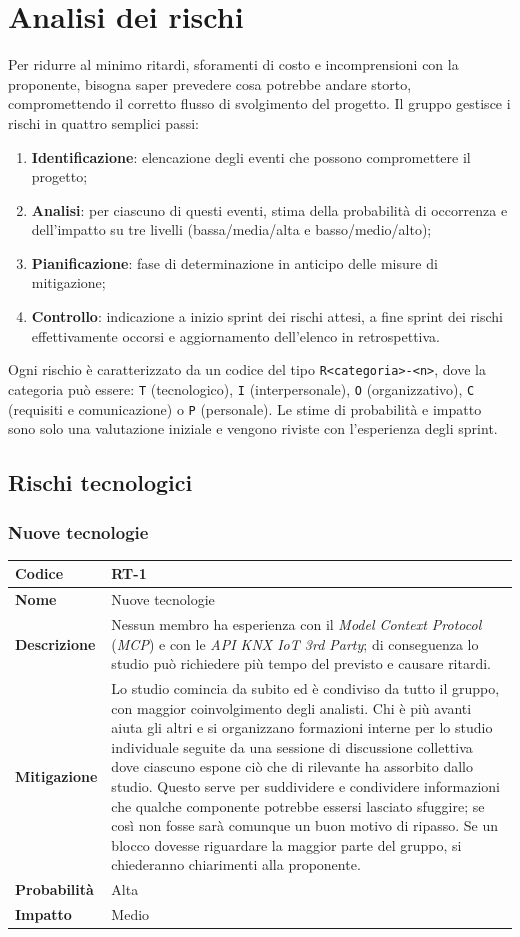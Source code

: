\documentclass[11pt, a4paper]{article}
\newcommand{\rischio}[6]{%
	\subsubsection{#2}\label{risk:#1}
	\begin{center}
		\arrayrulecolor{gray!50}\renewcommand{\arraystretch}{1.4}
		\setlength{\arrayrulewidth}{0.8pt}
		\begin{tabularx}{\textwidth}{|l|X|}
			\hline
			\rowcolor{gray!10} \textbf{Codice}   & #1 \\ \hline
			\textbf{Nome}                        & #2 \\ \hline
			\textbf{Descrizione}                 & #3 \\ \hline
			\textbf{Mitigazione}                 & #4 \\ \hline
			\textbf{Probabilità}                 & #5 \\ \hline
			\textbf{Impatto}                     & #6 \\ \hline
		\end{tabularx}
		\arrayrulecolor{black}
	\end{center}
}
\begin{document}
	\section{Analisi dei rischi}
	Per ridurre al minimo ritardi, sforamenti di costo e incomprensioni con la proponente, bisogna saper prevedere cosa potrebbe andare storto, compromettendo il corretto flusso di svolgimento del progetto. Il gruppo gestisce i rischi in quattro semplici passi:
	\begin{enumerate}
		\item \textbf{Identificazione}: elencazione degli eventi che possono compromettere il progetto;
		\item \textbf{Analisi}: per ciascuno di questi eventi, stima della probabilità di occorrenza e dell'impatto su tre livelli (bassa/media/alta e basso/medio/alto);
		\item \textbf{Pianificazione}: fase di determinazione in anticipo delle misure di mitigazione;
		\item \textbf{Controllo}: indicazione a inizio sprint dei rischi attesi, a fine sprint dei rischi effettivamente occorsi e aggiornamento dell'elenco in retrospettiva.
	\end{enumerate}
	Ogni rischio è caratterizzato da un codice del tipo \texttt{R<categoria>-<n>}, dove la categoria può essere: \texttt{T} (tecnologico), \texttt{I} (interpersonale), \texttt{O} (organizzativo), \texttt{C} (requisiti e comunicazione) o \texttt{P} (personale). Le stime di probabilità e impatto sono solo una valutazione iniziale e vengono riviste con l'esperienza degli sprint.
	
	\subsection{Rischi tecnologici}
	\rischio{RT-1}{Nuove tecnologie}
	{Nessun membro ha esperienza con il \textit{Model Context Protocol} (\textit{MCP}) e con le \textit{API KNX IoT 3rd Party}; di conseguenza lo studio può richiedere più tempo del previsto e causare ritardi.}
	{Lo studio comincia da subito ed è condiviso da tutto il gruppo, con maggior coinvolgimento degli analisti. Chi è più avanti aiuta gli altri e si organizzano formazioni interne per lo studio individuale seguite da una sessione di discussione collettiva dove ciascuno espone ciò che di rilevante ha assorbito dallo studio. Questo serve per suddividere e condividere informazioni che qualche componente potrebbe essersi lasciato sfuggire; se così non fosse sarà comunque un buon motivo di ripasso. Se un blocco dovesse riguardare la maggior parte del gruppo, si chiederanno chiarimenti alla proponente.}
	{Alta}{Medio}
	
\end{document}
